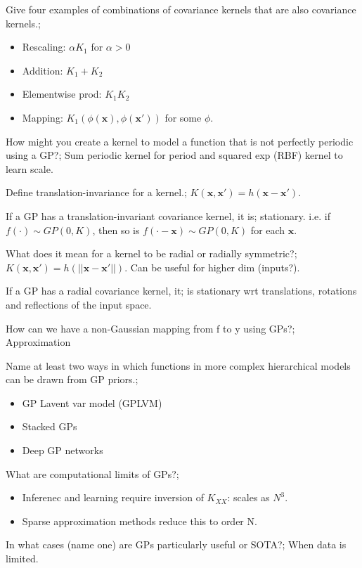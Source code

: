 \documentclass{article}
\begin{document}
Give four examples of combinations of covariance kernels that are also covariance kernels.; \begin{itemize}
    \item Rescaling: $\alpha K_1$ for $\alpha > 0$
    \item Addition: $K_1+K_2$
    \item Elementwise prod: $K_1K_2$
    \item Mapping: $K_1(\phi(\mathbf{x}), \phi(\mathbf{x'}))$ for some $\phi$.
\end{itemize}

How might you create a kernel to model a function that is not perfectly periodic using a GP?; Sum periodic kernel for period and squared exp (RBF) kernel to learn scale.

Define translation-invariance for a kernel.; $K(\mathbf{x, x'})=h(\mathbf{x-x'})$.

If a GP has a translation-invariant covariance kernel, it is; stationary. i.e. if $f(\cdot)\sim GP(0, K)$, then so is $f(\cdot - \mathbf{x})\sim GP(0, K)$ for each $\mathbf{x}$.

What does it mean for a kernel to be radial or radially symmetric?; $K(\mathbf{x, x'})=h(||\mathbf{x-x'}||)$. Can be useful for higher dim (inputs?).

If a GP has a radial covariance kernel, it; is stationary wrt translations, rotations and reflections of the input space.

How can we have a non-Gaussian mapping from f to y using GPs?; Approximation

Name at least two ways in which functions in more complex hierarchical models can be drawn from GP priors.; \begin{itemize}
    \item GP Lavent var model (GPLVM)
    \item Stacked GPs
    \item Deep GP networks
\end{itemize}

What are computational limits of GPs?; \begin{itemize}
    \item Inferenec and learning require inversion of $K_{XX}$: scales as $N^3$. 
    \item Sparse approximation methods reduce this to order N.
\end{itemize}

In what cases (name one) are GPs particularly useful or SOTA?; When data is limited.
\end{document}
